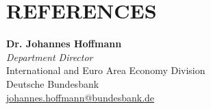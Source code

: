 \documentclass[a4paper,9pt]{extarticle}
\begin{document}
\clearpage



\section*{REFERENCES}

\noindent
\textbf{Dr. Johannes Hoffmann} \\
\textit{Department Director} \\
International and Euro Area Economy Division \\
Deutsche Bundesbank \\
\href{mailto:johannes.hoffmann@bundesbank.de}{johannes.hoffmann@bundesbank.de} \\


\end{document}
